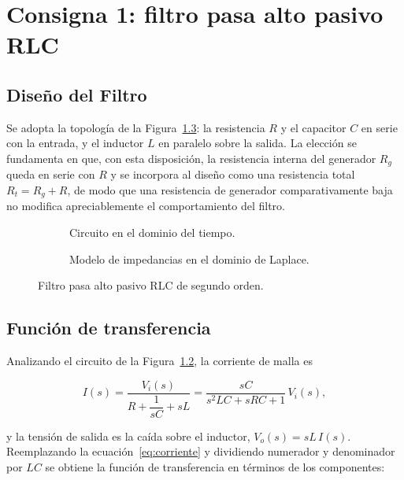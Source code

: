 \chapter{Consigna 1: filtro pasa alto pasivo RLC}
\label{chap:consigna1}

\section{Diseño del Filtro}

Se adopta la topología de la Figura~\ref{fig:circuito}: la resistencia $R$ y el capacitor $C$ en serie con
la entrada, y el inductor $L$ en paralelo sobre la salida. La elección se fundamenta en que, con esta
disposición, la resistencia interna del generador $R_g$ queda en serie con $R$ y se incorpora al diseño
como una resistencia total $R_t = R_g + R$, de modo que una resistencia de generador comparativamente baja
no modifica apreciablemente el comportamiento del filtro.

\begin{figure}[!ht]
  \centering
  \begin{subfigure}[t]{0.48\textwidth}
    \centering
    
    \caption{Circuito en el dominio del tiempo.}
    \label{crkt:pasa-alto}
  \end{subfigure}
  \hfill
  \begin{subfigure}[t]{0.48\textwidth}
    \centering
    
    \caption{Modelo de impedancias en el dominio de Laplace.}
    \label{crkt:laplace}
  \end{subfigure}
  \caption{Filtro pasa alto pasivo RLC de segundo orden.}
  \label{fig:circuito}
\end{figure}

\section{Función de transferencia}

Analizando el circuito de la Figura~\ref{crkt:laplace}, la corriente de malla es

\begin{equation}
  I(s) = \frac{V_i(s)}{R + \dfrac{1}{sC} + sL} = \frac{sC}{s^2 LC + sRC + 1}\, V_i(s),
  \label{eq:corriente}
\end{equation}

y la tensión de salida es la caída sobre el inductor, $V_o(s) = sL\, I(s)$. Reemplazando la
ecuación~\eqref{eq:corriente} y dividiendo numerador y denominador por $LC$ se obtiene la función de
transferencia en términos de los componentes:

